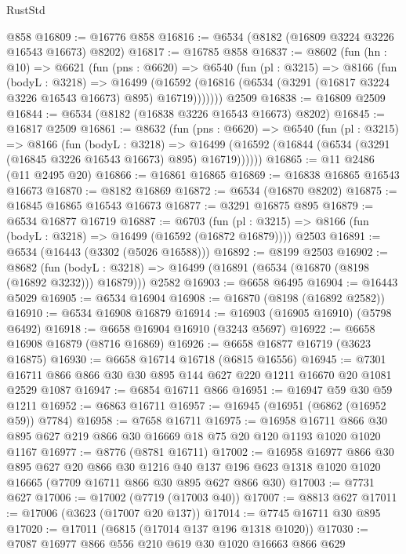 \begin{lexlean}{RustStd}
\begin{coremodule}
    @858
@16809 := @16776 @858
@16816 := @6534 (@8182 (@16809 @3224 @3226 @16543 @16673) @8202)
@16817 := @16785 @858
@16837 := @8602
    (fun (hn : @10) =>
    @6621
      (fun (pns : @6620) =>
      @6540
        (fun (pl : @3215) =>
        @8166
          (fun (bodyL : @3218) =>
          @16499
            (@16592 (@16816 (@6534 (@3291 (@16817 @3224 @3226 @16543 @16673) @895) @16719)))))))
    @2509
@16838 := @16809 @2509
@16844 := @6534 (@8182 (@16838 @3226 @16543 @16673) @8202)
@16845 := @16817 @2509
@16861 := @8632
    (fun (pns : @6620) =>
    @6540
      (fun (pl : @3215) =>
      @8166
        (fun (bodyL : @3218) =>
        @16499 (@16592 (@16844 (@6534 (@3291 (@16845 @3226 @16543 @16673) @895) @16719))))))
@16865 := @11 @2486 (@11 @2495 @20)
@16866 := @16861 @16865
@16869 := @16838 @16865 @16543 @16673
@16870 := @8182 @16869
@16872 := @6534 (@16870 @8202)
@16875 := @16845 @16865 @16543 @16673
@16877 := @3291 @16875 @895
@16879 := @6534 @16877 @16719
@16887 := @6703
    (fun (pl : @3215) => @8166 (fun (bodyL : @3218) => @16499 (@16592 (@16872 @16879))))
    @2503
@16891 := @6534 (@16443 (@3302 (@5026 @16588)))
@16892 := @8199 @2503
@16902 := @8682
    (fun (bodyL : @3218) => @16499 (@16891 (@6534 (@16870 (@8198 (@16892 @3232))) @16879)))
    @2582
@16903 := @6658 @6495
@16904 := @16443 @5029
@16905 := @6534 @16904
@16908 := @16870 (@8198 (@16892 @2582))
@16910 := @6534 @16908 @16879
@16914 := @16903 (@16905 @16910) (@5798 @6492)
@16918 := @6658 @16904 @16910 (@3243 @5697)
@16922 := @6658 @16908 @16879 (@8716 @16869)
@16926 := @6658 @16877 @16719 (@3623 @16875)
@16930 := @6658 @16714 @16718 (@6815 @16556)
@16945 := @7301 @16711 @866 @866 @30 @30 @895 @144 @627 @220 @1211 @16670 @20 @1081 @2529 @1087
@16947 := @6854 @16711 @866
@16951 := @16947 @59 @30 @59 @1211
@16952 := @6863 @16711
@16957 := @16945 (@16951 (@6862 (@16952 @59)) @7784)
@16958 := @7658 @16711
@16975 := @16958
    @16711
    @866
    @30
    @895
    @627
    @219
    @866
    @30
    @16669
    @18
    @75
    @20
    @120
    @1193
    @1020
    @1020
    @1167
@16977 := @8776 (@8781 @16711)
@17002 := @16958
    @16977
    @866
    @30
    @895
    @627
    @20
    @866
    @30
    @1216
    @40
    @137
    @196
    @623
    @1318
    @1020
    @1020
    @16665
    (@7709 @16711 @866 @30 @895 @627 @866 @30)
@17003 := @7731 @627
@17006 := @17002 (@7719 (@17003 @40))
@17007 := @8813 @627
@17011 := @17006 (@3623 (@17007 @20 @137))
@17014 := @7745 @16711 @30 @895
@17020 := @17011 (@6815 (@17014 @137 @196 @1318 @1020))
@17030 := @7087 @16977 @866 @556 @210 @619 @30 @1020 @16663 @866 @629

\end{coremodule}
\end{lexlean}
